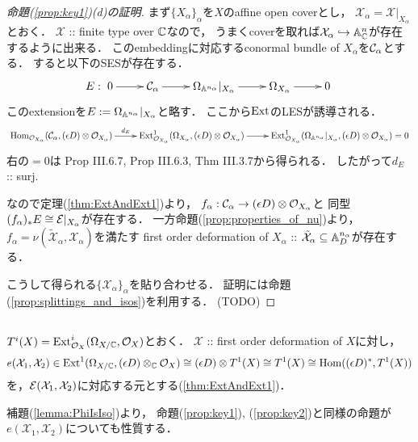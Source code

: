 \documentclass[a4paper]{jsarticle}
\newcommand{\defX}{\mathcal{X}}
\begin{document}
    \begin{proof}[命題(\ref{prop:key1})(d)の証明]
        まず$\{X_{\alpha}\}_{\alpha}$を$X$のaffine open coverとし，
        $\defX_{\alpha}=\defX|_{X_{\alpha}}$とおく．
        $\defX$ :: finite type over $\mathbb{C}$なので，
        うまくcoverを取れば$\defX_{\alpha} \inclmap \affine^{n}_{\C}$が存在するように出来る．
        このembeddingに対応するconormal bundle of $X_{\alpha}$を$\mathcal{C}_{\alpha}$とする．
        すると以下のSESが存在する．
        \[
            E:
        \xymatrix{
            0 \ar[r]& \shC_{\alpha} \ar[r]& \shDer_{\affine^{n_{\alpha}}}|_{X_{\alpha}} \ar[r]& 
            \shDer_{X_{\alpha}} \ar[r]& 0
        }\]
        このextensionを$E:=\Omega_{\mathbb{A}^{n_{\alpha}}}|_{X_{\alpha}}$と略す．
        ここから$\operatorname{Ext}$のLESが誘導される．
        \[\xymatrix{
            \Hom_{\shO_{X_{\alpha}}}(\shC_{\alpha}, (\epsilon D) \otimes \shO_{X_{\alpha}})
            \ar[r]^-{d_{E}}&
            \Ext^1_{\shO_{X_{\alpha}}}(\shDer_{X_{\alpha}}, (\epsilon D) \otimes \shO_{X_{\alpha}})
            \ar[r]&
            \Ext^1_{\shO_{X_{\alpha}}}(\shDer_{\affine^{n_{\alpha}}}|_{X_{\alpha}},
                (\epsilon D) \otimes \shO_{X_{\alpha}})
            =0
        }\]
        右の$=0$は\cite{HarAG} Prop III.6.7, Prop III.6.3, Thm III.3.7から得られる．
        したがって$d_{E}$ :: surj.
        
        なので定理(\ref{thm:ExtAndExt1})より，
        $f_{\alpha}: \mathcal{C}_{\alpha} \to (\epsilon D) \otimes \mathcal{O}_{X_{\alpha}}$と
        同型$(f_{\alpha})_*E \cong \mathcal{E}|_{X_{\alpha}}$が存在する．
        一方命題(\ref{prop:properties_of_nu})より，
        $f_{\alpha}=\nu(\tilde{\defX}_{\alpha}, \defX_{\alpha})$を満たす
        first order deformation of $X_{\alpha}$
        :: $\tilde{\defX}_{\alpha} \subseteq \affine^{n_{\alpha}}_D$が存在する．
        
        こうして得られる$\{\defX_{\alpha}\}_{\alpha}$を貼り合わせる．
        証明には命題(\ref{prop:splittings_and_isos})を利用する．
        (TODO)
    \end{proof}

    \subsection{\tp{$e(\defX_1, \defX_2)$}{e(X1,X2)}}
    \begin{Def}
        $T^i(X)=\operatorname{Ext}^i_{\mathcal{O}_X}(\Omega_{X/\mathbb{C}}, \mathcal{O}_X)$とおく．
        $\defX$ :: first order deformation of $X$に対し，
        \[
            e(\defX_1, \defX_2)
                \in
                \Ext^1(\shDer_{X/\C}, (\epsilon D) \otimes_{\C} \shO_X)
                \iso (\epsilon D) \otimes T^1(X)
                \iso T^1(X)
                \iso \Hom((\epsilon D)^*, T^1(X))
        \]
        を，$\shE(\defX_1, \defX_2)$に対応する元とする(\ref{thm:ExtAndExt1})．
    \end{Def}
    補題(\ref{lemma:PhiIsIso})より，
    命題(\ref{prop:key1}), (\ref{prop:key2})と同様の命題が
    $e(\defX_1, \defX_2)$についても性質する．
\end{document}

